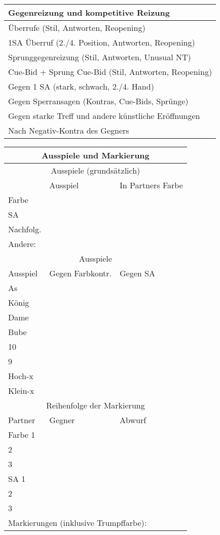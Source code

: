 \documentclass{article}
\begin{document}
\begin{multicols}{3}

\begin{tabular}{|l|}
\hline Gegenreizung und kompetitive Reizung \\
\hline Überrufe (Stil, Antworten, Reopening) \\
\hline 1SA Überruf (2./4. Position, Antworten, Reopening) \\
\hline Sprunggegenreizung (Stil, Antworten, Unusual NT) \\
\hline Cue-Bid + Sprung Cue-Bid (Stil, Antworten, Reopening) \\
\hline Gegen 1 SA (stark, schwach, 2./4. Hand) \\
\hline Gegen Sperransagen (Kontras, Cue-Bids, Sprünge) \\
\hline Gegen starke Treff und andere künstliche Eröffnungen \\
\hline Nach Negativ-Kontra des Gegners \\
\hline \end{tabular}

\begin{tabular}{|l|l|l|}
\hline \multicolumn{3}{c}{Ausspiele und Markierung} \\
\hline \multicolumn{3}{c}{Ausspiele (grundsätzlich)} \\
\hline & Ausspiel & In Partners Farbe \\
\hline Farbe & & \\
\hline SA & & \\
\hline Nachfolg. & & \\
\hline \multicolumn{3}{|l|}{Andere:} \\

\hline \multicolumn{3}{c}{Ausspiele} \\
\hline Ausspiel & Gegen Farbkontr. & Gegen SA \\
\hline As & & \\
\hline König & & \\
\hline Dame & & \\
\hline Bube & & \\
\hline 10 & & \\
\hline 9 & & \\
\hline Hoch-x & & \\
\hline Klein-x & & \\

\hline \multicolumn{3}{c}{Reihenfolge der Markierung} \\
\hline Partner & Gegner & Abwurf \\
\hline Farbe \hfill 1 & & \\
\hline       \hfill 2 & & \\
\hline       \hfill 3 & & \\
\hline SA    \hfill 1 & & \\
\hline       \hfill 2 & & \\
\hline       \hfill 3 & & \\
\hline \multicolumn{3}{|l|}{Markierungen (inklusive Trumpffarbe):} \\


\end{tabular}
\end{multicols}
\end{document}
